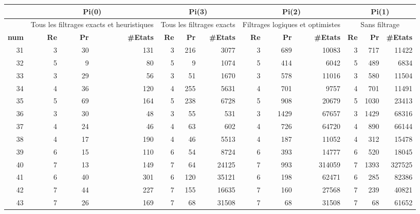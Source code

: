 \begin{table}[H]
	\centering
	\small
	\begin{tabular}{|r|rrr|rrr|rrr|rrr|}
		\toprule
		\hline
		\rowcolor{cyan}	&\multicolumn{3}{c|}{\textbf{Pi(0)}} & \multicolumn{3}{c|}{\textbf{Pi(3)}}&\multicolumn{3}{c|}{\textbf{Pi(2)}}&\multicolumn{3}{c|}{\textbf{Pi(1)}} \\ \hline
		\midrule
		
		\hline
		\rowcolor{cyan}	&\multicolumn{3}{c|}{ \tiny{Tous les filtrages exacts et heuristiques}} & \multicolumn{3}{c|}{\tiny{Tous les filtrages exacts}}&\multicolumn{3}{c|}{\tiny{Filtrages logiques et optimistes}}&\multicolumn{3}{c|}{\tiny{Sans filtrage}}
		\\ \hline
		\midrule
		
		\rowcolor{cyan}	\textbf{num} & \textbf{Re} & \textbf{Pr} & \textbf{\#Etats} & \textbf{Re} & \textbf{Pr} & \textbf{\#Etats} & \textbf{Re} & \textbf{Pr} & \textbf{\#Etats} &\textbf{Re} & \textbf{Pr} & \textbf{\#Etats} \\ \hline
		\midrule
		31	&	3	&	30	&	131	&	3	&	216	&	3077	&	3	&	689	&	10083	&	3	&	717	&	11422	\\ \hline
		32	&	5	&	9	&	80	&	5	&	9	&	1074	&	5	&	414	&	6042	&	5	&	489	&	6834	\\ \hline
		33	&	3	&	29	&	56	&	3	&	51	&	1670	&	3	&	578	&	11016	&	3	&	580	&	11504	\\ \hline
		34	&	4	&	36	&	120	&	4	&	255	&	5631	&	4	&	701	&	9757	&	4	&	701	&	11491	\\ \hline
		35	&	5	&	69	&	164	&	5	&	238	&	6728	&	5	&	908	&	20679	&	5	&	1030	&	23413	\\ \hline
		36	&	3	&	30	&	48	&	3	&	55	&	531	&	3	&	1429	&	67657	&	3	&	1429	&	68316	\\ \hline
		37	&	4	&	24	&	46	&	4	&	63	&	602	&	4	&	726	&	64720	&	4	&	890	&	66144	\\ \hline
		38	&	4	&	17	&	190	&	4	&	46	&	5513	&	4	&	187	&	11052	&	4	&	312	&	15478	\\ \hline
		39	&	6	&	15	&	110	&	6	&	54	&	8724	&	6	&	393	&	14777	&	6	&	520	&	18045	\\ \hline
		40	&	7	&	13	&	149	&	7	&	64	&	24125	&	7	&	993	&	314059	&	7	&	1393	&	327525	\\ \hline
		41	&	6	&	40	&	301	&	6	&	120	&	35121	&	6	&	198	&	62471	&	6	&	285	&	82386	\\ \hline
		42	&	7	&	44	&	227	&	7	&	155	&	16635	&	7	&	160	&	27568	&	7	&	239	&	40821	\\ \hline
		43	&	7	&	26	&	169	&	7	&	68	&	31508	&	7	&	68	&	31508	&	7	&	68	&	61652	\\ \hline

\end{tabular}
\end{table}

